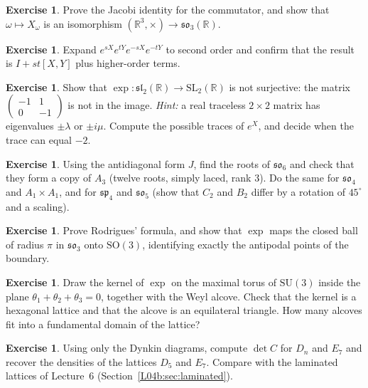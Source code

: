\documentclass[11pt,openany]{book}
\theoremstyle{plain}
\theoremstyle{definition}
\newtheorem{exercise}[theorem]{Exercise}
\theoremstyle{remark}
\newcommand{\R}{\mathbb{R}}
\newcommand{\SL}{\mathrm{SL}}
\newcommand{\SO}{\mathrm{SO}}
\begin{document}
\begin{exercise}
Prove the Jacobi identity for the commutator, and show that $\omega\mapsto X_\omega$ is an isomorphism
$(\R^3,\times)\to\mathfrak{so}_3(\R)$.
\end{exercise}

\begin{exercise}
Expand $e^{sX}e^{tY}e^{-sX}e^{-tY}$ to second order and confirm that the result is $I+st[X,Y]$ plus
higher-order terms.
\end{exercise}

\begin{exercise}
Show that $\exp\colon\mathfrak{sl}_2(\R)\to\SL_2(\R)$ is not surjective: the matrix
$\left(\begin{smallmatrix}-1&1\\0&-1\end{smallmatrix}\right)$ is not in the image. \emph{Hint:} a real
traceless $2\times2$ matrix has eigenvalues $\pm\lambda$ or $\pm i\mu$. Compute the possible traces of
$e^X$, and decide when the trace can equal $-2$.
\end{exercise}

\begin{exercise}
Using the antidiagonal form $J$, find the roots of $\mathfrak{so}_6$ and check that they form a copy of
$A_3$ (twelve roots, simply laced, rank $3$). Do the same for $\mathfrak{so}_4$ and $A_1\times A_1$, and for
$\mathfrak{sp}_4$ and $\mathfrak{so}_5$ (show that $C_2$ and $B_2$ differ by a rotation of $45^\circ$ and a scaling).
\end{exercise}

\begin{exercise}
Prove Rodrigues' formula, and show that $\exp$ maps the closed ball of radius $\pi$ in $\mathfrak{so}_3$
onto $\SO(3)$, identifying exactly the antipodal points of the boundary.
\end{exercise}

\begin{exercise}
Draw the kernel of $\exp$ on the maximal torus of $\mathrm{SU}(3)$ inside the plane
$\theta_1+\theta_2+\theta_3=0$, together with the Weyl alcove. Check that the kernel is a hexagonal
lattice and that the alcove is an equilateral triangle. How many alcoves fit into a fundamental domain
of the lattice?
\end{exercise}

\begin{exercise}
Using only the Dynkin diagrams, compute $\det C$ for $D_n$ and $E_7$ and recover the densities of the
lattices $D_5$ and $E_7$. Compare with the laminated lattices of Lecture~6
(Section~\ref{L04b:sec:laminated}).
\end{exercise}
\end{document}
